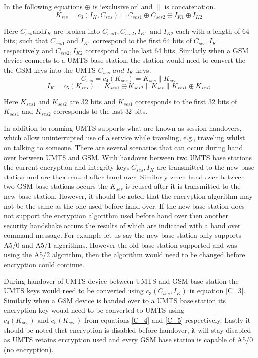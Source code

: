 \documentclass{sig-alternate}
\begin{document}
	In the following equations $\oplus$ is `exclusive or' and $\|$ is concatenation.
\begin{equation}
	\label{C_3}
	\mathit{K_{ses} = c_{3}(I_{K},C_{ses}) = C_{ses1} \oplus C_{ses2}\oplus I_{K1} \oplus I_{K2}}
\end{equation}

Here $C_{ses} \text{and} I_{K} $ are broken into  $C_{ses1},C_{ses2},I_{K1}\text{ and }I_{K2}$ each with a length of 64 bits; such that $C_{ses1}$ and $I_{K1}$ correspond to the first 64 bits of $C_{ses},I_{K}$ respectively and $C_{ses2},I_{K2}$ correspond to the last 64 bits.
 Similarly when a GSM device connects to a UMTS base station, the station would need to convert the the GSM keys into the UMTS $\mathit{C_{ses} \text{ and } I_{K}}$ keys. 
\begin{equation} 
\label{C_4}
	\mathit{C_{ses} = c_{4}(K_{ses}) = K_{ses} \| K_{ses}}
\end{equation}
\begin{equation}
\label{C_5}
	\mathit{I_{K} = c_{5}(K_{ses}) = K_{ses1}\oplus K_{ses2}\|K_{ses}\|K_{ses1}\oplus K_{ses2}}
\end{equation}

Here $K_{ses1} \text{ and } K_{ses2}$ are 32 bits and $K_{ses1}$ corresponds to the first 32 bits of $K_{ses1}$ and $K_{ses2}$ corresponds to the last 32 bits.
 
In addition to roaming UMTS supports what are known as session handovers, which allow uninterrupted use of a service while traveling, e.g., traveling whilst on talking to someone. There are several scenarios that can occur during hand over between UMTS and GSM. With handover between two UMTS base stations the current encryption and integrity keys $C_{ses},I_{K}$ are transmitted to the new base station and are then reused after hand over. Similarly when hand over between two GSM base stations occurs the $K_{ses}$ is reused after it is transmitted to the new base station. However, it should be noted that the encryption algorithm may not be the same as the one used before hand over. If the new base station does not support the encryption algorithm used before hand over then another security handshake occurs the results of which are indicated with a hand over command message. For example let us say the new base station only supports A5/0 and A5/1 algorithms. However the old base station supported and was using the A5/2 algorithm, then the algorithm would need to be changed before encryption could continue. 

 During handover of UMTS device between UMTS and GSM base station the UMTS keys would need to be converted using $c_{3}(C_{ses},I_{K})$ in equation \ref{C_3}. Similarly when a GSM device is handed over to a UMTS base station its encryption key would need to be converted to UMTS using $c_{4}(K_{ses}) \text{ and } c_{5}(K_{ses})$ from equations \ref{C_4} and \ref{C_5} respectively. Lastly it should be noted that encryption is disabled before handover, it will stay disabled as UMTS retains encryption used and every GSM base station is capable of A5/0 (no encryption).   
	
\end{document}
